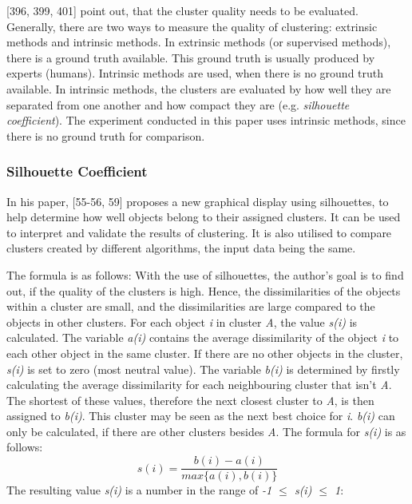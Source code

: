  \textcite{han2011data}[396, 399, 401] point out, that the cluster quality needs to be evaluated. Generally, there are two ways to measure the quality of clustering: extrinsic methods and intrinsic methods. In extrinsic methods (or supervised methods), there is a ground truth available. This ground truth is usually produced by experts (humans). Intrinsic methods are used, when there is no ground truth available. In intrinsic methods, the clusters are evaluated by how well they are separated from one another and how compact they are (e.g. \textit{silhouette coefficient}). The experiment conducted in this paper uses intrinsic methods, since there is no ground truth for comparison.


\subsubsection{Silhouette Coefficient}
\label{section:silhouetteCoefficient}
In his paper, \textcite{rousseeuw1987silhouettes}[55-56, 59] proposes a new graphical display using silhouettes, to help determine how well objects belong to their assigned clusters. It can be used to interpret and validate the results of clustering. It is also utilised to compare clusters created by different algorithms, the input data being the same.

The formula is as follows:
With the use of silhouettes, the author's goal is to find out, if the quality of the clusters is high. Hence, the dissimilarities of the objects within a cluster are small, and the dissimilarities are large compared to the objects in other clusters. For each object \textit{i} in cluster \textit{A}, the value \textit{s(i)} is calculated. The variable \textit{a(i)} contains the average dissimilarity of the object \textit{i} to each other object in the same cluster. If there are no other objects in the cluster, \textit{s(i)} is set to zero (most neutral value). The variable \textit{b(i)} is determined by firstly calculating the average dissimilarity for each neighbouring cluster that isn't \textit{A}. The shortest of these values, therefore the next closest cluster to \textit{A}, is then assigned to \textit{b(i)}. This cluster may be seen as the next best choice for \textit{i}. \textit{b(i)} can only be calculated, if there are other clusters besides \textit{A}. The formula for \textit{s(i)} is as follows:
\[
  s(i) = \frac{b(i) - a(i)}{max\{a(i), b(i)\}}  
\]
The resulting value \textit{s(i)} is a number in the range of \textit{-1 $\leq$ \textit{s(i)} $\leq$ 1}:

